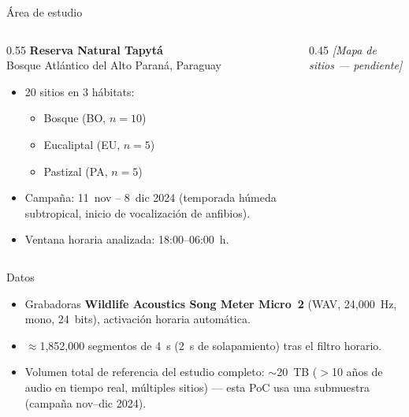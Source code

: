 \documentclass[11pt, aspectratio=169]{beamer}
\begin{document}
\begin{frame}{Área de estudio}
  \begin{columns}[T]
    \begin{column}{0.55\textwidth}
      \textbf{Reserva Natural Tapytá}\\
      Bosque Atlántico del Alto Paraná, Paraguay
      \vspace{0.5em}
      \begin{itemize}
        \item 20 sitios en 3 hábitats:
          \begin{itemize}
            \item Bosque (BO, $n=10$)
            \item Eucaliptal (EU, $n=5$)
            \item Pastizal (PA, $n=5$)
          \end{itemize}
        \item Campaña: 11~nov -- 8~dic 2024 (temporada húmeda subtropical,
          inicio de vocalización de anfibios).
        \item Ventana horaria analizada: 18:00--06:00~h.
      \end{itemize}
    \end{column}
    \begin{column}{0.45\textwidth}
      \centering
      \textit{[Mapa de sitios --- pendiente]}
    \end{column}
  \end{columns}
\end{frame}

\begin{frame}{Datos}
  \begin{itemize}
    \item Grabadoras \textbf{Wildlife Acoustics Song Meter Micro~2}
      (WAV, 24{,}000~Hz, mono, 24~bits), activación horaria automática.
    \item $\approx$1{,}852{,}000 segmentos de 4~s (2~s de solapamiento)
      tras el filtro horario.
    \item Volumen total de referencia del estudio completo:
      $\sim$20~TB ($>$10 años de audio en tiempo real, múltiples sitios) ---
      esta PoC usa una submuestra (campaña nov--dic 2024).
  \end{itemize}
\end{frame}
\end{document}
